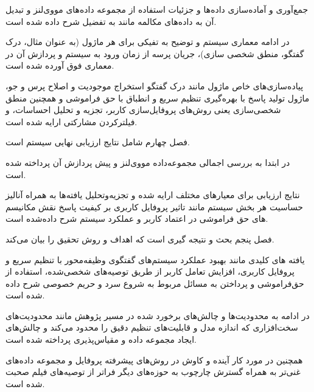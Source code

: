 جمع‌آوری و آماده‌سازی داده‌ها و جزئیات استفاده از مجموعه داده‌های مووی‌لنز  و تبدیل آن به داده‌های مکالمه مانند به تفضیل شرح داده شده است.

در ادامه معماری سیستم و توضیح به تفیکی برای هر ماژول (به عنوان مثال، درک گفتگو، منطق شخصی سازی)، جریان پرسه از زمان ورود به سیستم و  پردازش آن در معماری فوق آورده شده است.

پیاده‌سازی‌های خاص ماژول مانند درک گفتگو استخراج موجودیت و اصلاح پرس و جو، ماژول تولید پاسخ با بهره‌گیری تنظیم سریع و انطباق با حق فراموشی و همچنین منطق شخصی‌سازی یعنی روش‌های پروفایل‌سازی کاربر، تجزیه و تحلیل احساسات، و فیلتر‌کردن مشارکتی ارایه شده است.


فصل چهارم شامل نتایج ارزیابی نهایی سیستم است.

در ابتدا به بررسی اجمالی مجموعه‌داده مووی‌لنز و پیش پردازش آن پرداخته شده است.

نتایج ارزیابی برای معیارهای مختلف ارایه شده و  تجزیه‌و‌تحلیل یافته‌ها به همراه آنالیز حساسیت هر بخش سیستم مانند تاثیر پروفایل کاربری بر کیفیت پاسخ  نقش مکانیسم های حق فراموشی در اعتماد کاربر و عملکرد سیستم شرح داده‌شده است.


فصل پنجم بحث و نتیجه گیری است که اهداف و روش تحقیق را بیان می‌کند.

یافته های کلیدی مانند بهبود عملکرد  سیستم‌های گفتگوی وظیفه‌محور با تنظیم سریع و پروفایل کاربری، افزایش تعامل کاربر از طریق توصیه‌های شخصی‌شده، استفاده از حق‌فراموشی و پرداختن به مسائل مربوط به شروع سرد و حریم خصوصی شرح داده شده است.

در ادامه به محدودیت‌ها و چالش‌های برخورد شده در مسیر پژوهش مانند محدودیت‌های سخت‌افزاری که اندازه مدل و قابلیت‌های تنظیم دقیق را محدود می‌کند و چالش‌های ایجاد مجموعه داده و مقیاس‌پذیری پرداخته شده است.

همچنین در مورد کار آینده و کاوش در روش‌های پیشرفته پروفایل و مجموعه داده‌های غنی‌تر به همراه گسترش چارچوب به حوزه‌های دیگر فراتر از توصیه‌های فیلم صحبت شده است.
